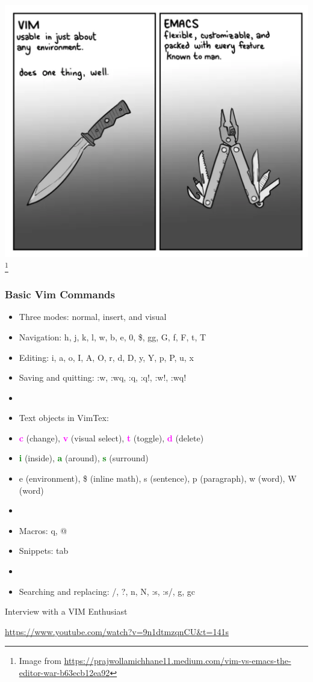 \documentclass[9pt,table,xcolor=dvipsnames]{beamer}%
\theoremstyle{definition}
\theoremstyle{plain}
\begin{document}
\begin{frame}[fragile,t] %
  \includegraphics[scale=0.18]{./figs/Vim_vs_Emas.png}
  \footnote{Image from \url{https://prajwollamichhane11.medium.com/vim-vs-emacs-the-editor-war-b63ecb12ea92}}
\end{frame}
\begin{frame}
  \frametitle{Basic Vim Commands}
  \begin{itemize}
    \item Three modes: normal, insert, and visual
    \item Navigation: h, j, k, l, w, b, e, 0, \$, gg, G, f, F, t, T
    \item Editing: i, a, o, I, A, O, r, d, D, y, Y, p, P, u, x
    \item Saving and quitting: :w, :wq, :q, :q!, :w!, :wq!
    \item[]
    \item Text objects in VimTex:
    \item[] \textcolor{magenta}{\bf c} (change), \textcolor{magenta}{\bf v} (visual
      select), \textcolor{magenta}{\bf t} (toggle), \textcolor{magenta}{\bf d} (delete)
    \item[] \textcolor{green}{\bf i} (inside), \textcolor{green}{\bf a} (around),
      \textcolor{green}{\bf s} (surround)
    \item[] e (environment), \$ (inline math), s (sentence), p (paragraph), w (word), W (word)
    \item[]
    \item Macros: q, @
    \item Snippets: tab
    \item[]
    \item Searching and replacing: /, ?, n, N, :s, :s/, g, gc
  \end{itemize}
\end{frame}
\begin{frame}[fragile] %

  Interview with a VIM Enthusiast \\ \bigskip

  \url{https://www.youtube.com/watch?v=9n1dtmzqnCU&t=141s}
\end{frame}
\end{document}
